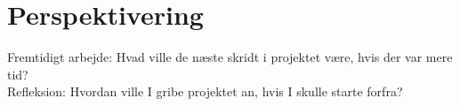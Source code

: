 \chapter{Perspektivering}
Fremtidigt arbejde: Hvad ville de næste skridt i projektet være, hvis der var mere tid?\\
Refleksion: Hvordan ville I gribe projektet an, hvis I skulle starte forfra? 
